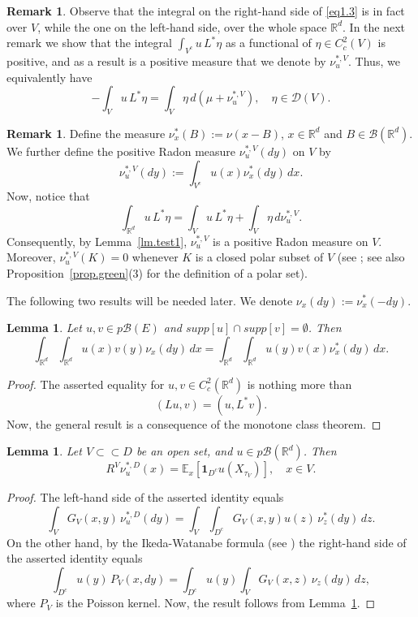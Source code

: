 \documentclass[11pt,a4paper,reqno]{amsart}
\newtheorem{lemma}[theorem]{\bf Lemma}
\theoremstyle{definition}
\newtheorem{remark}[theorem]{Remark}
\numberwithin{equation}{section}
\begin{document}
\begin{remark}
Observe that the integral on the right-hand side of \eqref{eq1.3} is in fact over $V$, 
while the one on the left-hand side, over the whole space $\mathbb R^d$. In the next remark 
we show that the integral $\int_{V^c}u \,L^*\eta$ as a functional of $\eta\in C^2_c(V)$ is positive,
and as a result is a positive measure that we denote by $\nu^{*,V}_u$. Thus, we equivalently have 
\begin{equation}
\label{eq1.3e}
-\int_{V}u \,L^*\eta=\int_{V}\eta\,d(\mu+\nu^{*,V}_u),\quad\eta\in \mathscr D(V).
\end{equation}
\end{remark}


\begin{remark}
\label{rem.imp}
Define the measure $\nu^*_x(B):=\nu(x-B)$, $x\in\mathbb R^d$ and $B\in\mathcal B(\mathbb R^d)$.
We further define the positive Radon measure $\nu^{*,V}_u(dy)$ on $V$ by 
\begin{equation}
\label{eq.defnust}
\nu^{*,V}_u(dy):= \int_{V^c}u(x)\nu^*_x(dy)\,dx.
\end{equation}
Now, notice that
\[
\int_{\mathbb R^d}u \,L^*\eta=\int_{V}u \,L^*\eta+\int_V \eta\,d\nu^{*,V}_u.
\]
Consequently, by Lemma~\ref{lm.test1}, $\nu^{*,V}_u$ is a positive Radon measure on $V$.
Moreover, $\nu^{*,V}_u(K)=0$ whenever $K$ is a closed polar subset of $V$
(see  \cite[Lemma 2.16]{BSW}; see also Proposition~\ref{prop.green}(3) for the definition of a polar set).
\end{remark}

The following two results will be needed later. We denote $\nu_x(dy):=\nu^*_x(-dy)$.

\begin{lemma}
\label{lm.ch1}
Let $u, v\in p\mathscr B(E)$ and
$supp[u]\cap supp[v] = \emptyset$. Then
\begin{equation}
\label{eq2.weq1}
\int_{\mathbb R^d}\int_{\mathbb R^d} u(x)v(y)\nu_x(dy)\,dx=
\int_{\mathbb R^d}\int_{\mathbb R^d} u(y)v(x)\nu^*_x(dy)\,dx.
\end{equation}
\end{lemma}
\begin{proof}
The asserted  equality for $u, v\in C_c^2(\mathbb R^d)$ is nothing more than  
\[
(Lu,v)=(u,L^*v). 
\]
Now, the general result is a consequence of the monotone class theorem.
\end{proof}

\begin{lemma}
\label{lm.hr1}
Let $V\subset\subset D$ be  an  open set,   and $u\in p\mathscr B(\mathbb R^d)$. 
Then
\[
R^{V}\nu^{*,D}_u(x)=\mathbb E_x [\mathbf1_{D^c} u(X_{\tau_V})],\quad x\in V.
\]
\end{lemma}
\begin{proof}
The left-hand side of the asserted identity equals
\[
\int_VG_V(x,y)\,\nu^{*,D}_u(dy)= \int_V\int_{D^c} G_V(x,y)u(z)\,\nu^{*}_z(dy)\,dz.
\]
On the other hand, by the Ikeda-Watanabe formula (see \cite{IW}) the right-hand side of the asserted identity equals 
\[
\int_{D^c}u(y)\, P_V(x,dy)=\int_{D^c}u(y)\int_V G_V(x,z)\,\nu_z(dy)\,dz,
\]
where $P_V$ is the Poisson kernel.
Now, the result follows from Lemma~\ref{lm.ch1}.
\end{proof}
\end{document}
